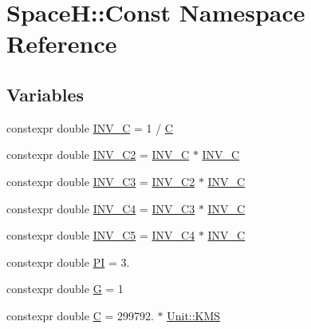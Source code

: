 \hypertarget{namespace_space_h_1_1_const}{}\section{SpaceH\+:\+:Const Namespace Reference}
\label{namespace_space_h_1_1_const}
\subsection*{Variables}
\begin{DoxyCompactItemize}
\item 
constexpr double \mbox{\hyperlink{namespace_space_h_1_1_const_a453eccad0d73caeedd6168a50d04d190}{I\+N\+V\+\_\+C}} = 1 / \mbox{\hyperlink{namespace_space_h_1_1_const_a2d7bff2e7b11ffe2fcc07333089c83a4}{C}}
\item 
constexpr double \mbox{\hyperlink{namespace_space_h_1_1_const_ac438c0ca124c73e6a55ef0d4afd05551}{I\+N\+V\+\_\+\+C2}} = \mbox{\hyperlink{namespace_space_h_1_1_const_a453eccad0d73caeedd6168a50d04d190}{I\+N\+V\+\_\+C}} $\ast$ \mbox{\hyperlink{namespace_space_h_1_1_const_a453eccad0d73caeedd6168a50d04d190}{I\+N\+V\+\_\+C}}
\item 
constexpr double \mbox{\hyperlink{namespace_space_h_1_1_const_a8a27f7c32317db823a656ceeaf6223dd}{I\+N\+V\+\_\+\+C3}} = \mbox{\hyperlink{namespace_space_h_1_1_const_ac438c0ca124c73e6a55ef0d4afd05551}{I\+N\+V\+\_\+\+C2}} $\ast$ \mbox{\hyperlink{namespace_space_h_1_1_const_a453eccad0d73caeedd6168a50d04d190}{I\+N\+V\+\_\+C}}
\item 
constexpr double \mbox{\hyperlink{namespace_space_h_1_1_const_a2adde6a8a2a2def2a09e650f6cdcbf98}{I\+N\+V\+\_\+\+C4}} = \mbox{\hyperlink{namespace_space_h_1_1_const_a8a27f7c32317db823a656ceeaf6223dd}{I\+N\+V\+\_\+\+C3}} $\ast$ \mbox{\hyperlink{namespace_space_h_1_1_const_a453eccad0d73caeedd6168a50d04d190}{I\+N\+V\+\_\+C}}
\item 
constexpr double \mbox{\hyperlink{namespace_space_h_1_1_const_a6e9515f852a58219dbb6ceb0f8b381a2}{I\+N\+V\+\_\+\+C5}} = \mbox{\hyperlink{namespace_space_h_1_1_const_a2adde6a8a2a2def2a09e650f6cdcbf98}{I\+N\+V\+\_\+\+C4}} $\ast$ \mbox{\hyperlink{namespace_space_h_1_1_const_a453eccad0d73caeedd6168a50d04d190}{I\+N\+V\+\_\+C}}
\item 
constexpr double \mbox{\hyperlink{namespace_space_h_1_1_const_afdcc70c6f78ec4cf7baad3525ba7c618}{PI}} = 3.
\item 
constexpr double \mbox{\hyperlink{namespace_space_h_1_1_const_ac17bec90d7d2b75f8f056347c7d6ced6}{G}} = 1
\item 
constexpr double \mbox{\hyperlink{namespace_space_h_1_1_const_a2d7bff2e7b11ffe2fcc07333089c83a4}{C}} = 299792. $\ast$ \mbox{\hyperlink{namespace_space_h_1_1_unit_a94c0a976eb50dcc88f04f3513049e8c3}{Unit\+::\+K\+MS}}
\end{DoxyCompactItemize}


